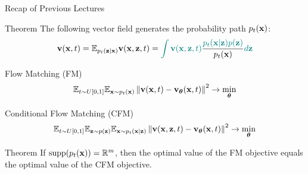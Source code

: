 \documentclass{beamer}
\begin{document}
\begin{frame}{Recap of Previous Lectures}
	\begin{block}{Theorem}
		The following vector field generates the probability path $p_t(\mathbf{x})$:
		\vspace{-0.2cm}
		\[
			\mathbf{v}(\mathbf{x}, t) = \mathbb{E}_{p_t(\mathbf{z} | \mathbf{x})} \mathbf{v}(\mathbf{x}, \mathbf{z}, t)  = {\color{teal}\int \mathbf{v}(\mathbf{x}, \mathbf{z}, t)} \frac{\color{teal}p_t(\mathbf{x} | \mathbf{z}) p(\mathbf{z})}{p_t(\mathbf{x})} {\color{teal}d \mathbf{z}}
		\]
		\vspace{-0.5cm}
	\end{block}
	\begin{block}{Flow Matching (FM)}
		\vspace{-0.5cm}
		\[
			\mathbb{E}_{t \sim U[0, 1]} \mathbb{E}_{\mathbf{x} \sim p_t(\mathbf{x})}\left\| \mathbf{v}(\mathbf{x}, t) - \mathbf{v}_{\boldsymbol{\theta}}(\mathbf{x}, t) \right\|^2 \rightarrow \min_{\boldsymbol{\theta}}
		\]
		\vspace{-0.5cm}
	\end{block}
	\begin{block}{Conditional Flow Matching (CFM)}
		\vspace{-0.5cm}
		\[
			\mathbb{E}_{t \sim U[0, 1]} \mathbb{E}_{\mathbf{z} \sim p(\mathbf{z})} \mathbb{E}_{\mathbf{x} \sim p_t(\mathbf{x} | \mathbf{z})}\left\| \mathbf{v}(\mathbf{x}, \mathbf{z}, t) - \mathbf{v}_{\boldsymbol{\theta}}(\mathbf{x}, t) \right\|^2 \rightarrow \min_{\boldsymbol{\theta}}
		\]
		\vspace{-0.7cm}
	\end{block}
	\begin{block}{Theorem}
		If $\operatorname{supp}(p_t(\mathbf{x})) = \mathbb{R}^m$, then the optimal value of the FM objective equals the optimal value of the CFM objective.
	\end{block}
\end{frame}
\end{document}
